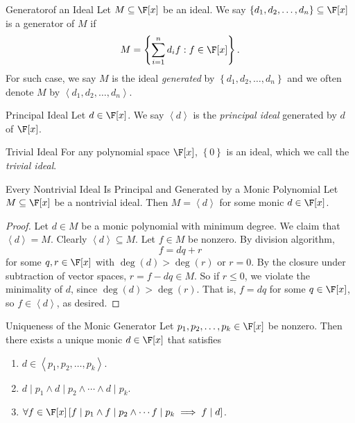 \documentclass[math_245.tex]{subfiles}
\begin{document}
    \begin{definition}{Generator}{of an Ideal}
        Let $M\subseteq \F[x]$ be an ideal. We say $\left\lbrace d_1, d_2, \ldots, d_n \right\rbrace \subseteq \F[x]$ is a generator of $M$ if
        \begin{equation*}
            M = \left\lbrace \sum^{n}_{i=1} d_if : f\in \F[x] \right\rbrace.
        \end{equation*}
        For such case, we say $M$ is the ideal \emph{generated} by $\left\lbrace d_1, d_2, \ldots, d_n \right\rbrace$ and we often denote $M$ by $\left< d_1, d_2, \ldots, d_n \right>$.
    \end{definition}

    \begin{definition}{Principal Ideal}{}
        Let $d\in \F[x]$. We say $\left<d\right>$ is the \emph{principal ideal} generated by $d$ of $\F[x]$.
    \end{definition}

    \begin{definition}{Trivial Ideal}{}
        For any polynomial space $\F[x]$, $\left\lbrace 0 \right\rbrace$ is an ideal, which we call the \emph{trivial ideal}.
    \end{definition}

    \begin{prop}{Every Nontrivial Ideal Is Principal and Generated by a Monic Polynomial}
        Let $M\subseteq \F[x]$ be a nontrivial ideal. Then $M = \left<d\right>$ for some monic $d\in \F[x]$.
    \end{prop}

    \begin{proof}
        Let $d\in M$ be a monic polynomial with minimum degree. We claim that $\left< d \right> = M$. Clearly $\left< d \right> \subseteq M$. Let $f\in M$ be nonzero. By division algorithm,
        \begin{equation*}
            f = dq+r
        \end{equation*}
        for some $q,r\in \F[x]$ with $\deg(d) > \deg(r)$ or $r = 0$. By the closure under subtraction of vector spaces, $r = f-dq\in M$. So if $r\leq 0$, we violate the minimality of $d$, since $\deg(d) > \deg(r)$. That is, $f = dq$ for some $q\in \F[x]$, so $f\in \left< d \right>$, as desired. 
    \end{proof}

    \begin{cor}{Uniqueness of the Monic Generator}
        Let $p_1, p_2, \ldots, p_k\in \F[x]$ be nonzero. Then there exists a unique monic $d\in \F[x]$ that satisfies
        \begin{enumerate}
            \item $d\in \left< p_1, p_2, \ldots, p_k \right>$.  
            \item $d\mid p_1\land d\mid p_2\land \cdots \land d\mid p_k$.
            \item $\forall f\in \F[x] \left[ f\mid p_1\land f\mid p_2\land \cdots f\mid p_k \implies f\mid d \right]$. 
        \end{enumerate}
    \end{cor}	
\end{document}
